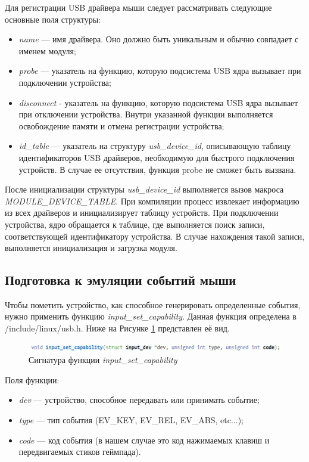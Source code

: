 Для регистрации USB драйвера мыши следует рассматривать
следующие основные поля структуры:
\begin{itemize}
	\item \textit{name} --- имя драйвера. Оно должно быть уникальным и обычно совпадает с именем модуля;
	\item \textit{probe} --- указатель на функцию, которую подсистема USB ядра вызывает при подключении устройства;
	\item \textit{disconnect} - указатель на функцию, которую подсистема USB ядра вызывает при отключении
	устройства. Внутри указанной функции выполняется освобождение
	памяти и отмена регистрации устройства;
	\item \textit{id\_table} --- указатель на структуру\textit{ usb\_device\_id}, описывающую таблицу
	идентификаторов USB драйверов, необходимую для быстрого
	подключения устройств. В случае ее отсутствия, функция probe не
	сможет быть вызвана.
\end{itemize}\par
После инициализации структуры \textit{usb\_device\_id} выполняется вызов
макроса \textit{MODULE\_DEVICE\_TABLE}. При компиляции процесс извлекает
информацию из всех драйверов и инициализирует таблицу устройств. При
подключении устройства, ядро обращается к таблице, где выполняется поиск
записи, соответствующей идентификатору устройства. В случае нахождения
такой записи, выполняется инициализация и загрузка модуля.

\subsection{Подготовка к эмуляции событий мыши}
Чтобы пометить устройство, как способное генерировать определенные события, нужно 
применить функцию \textit{input\_set\_capability}. Данная функция определена в /include/linux/usb.h.
Ниже на Рисунке \ref{input_set} представлен её вид.
\begin{figure}[h!]
	\centering
	\includegraphics[scale=0.9]{img/input-set-capability.png}
	\caption{Сигнатура функции \textit{input\_set\_capability}}
	\label{input_set}
\end{figure}\par

Поля функции:
\begin{itemize}
	\item \textit{dev} --- устройство, способное передавать или принимать событие;
	\item \textit{type} --- тип события (EV\_KEY, EV\_REL, EV\_ABS, etc...);
	\item \textit{code} --- код события (в нашем случае это код нажимаемых клавиш и передвигаемых стиков геймпада).
\end{itemize}\par

